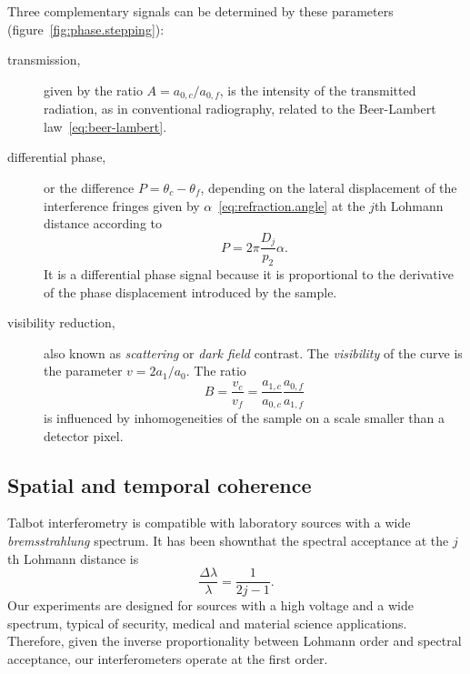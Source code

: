 Three complementary signals can be determined by these parameters
(figure~\ref{fig:phase.stepping}):
\begin{description}
    \item[transmission,] given by the ratio $A = a_{0,c} / a_{0,f}$, is the
        intensity of the transmitted radiation, as in conventional
        radiography, related to the Beer-Lambert
        law~\eqref{eq:beer-lambert}.
    \item[differential phase,] or the difference $P = \theta_{c} -
        \theta_f$, depending on the lateral displacement of the interference
        fringes given by
        $\alpha$~\eqref{eq:refraction.angle} at the
        $j$th Lohmann distance according to
        \begin{equation}
            P = 2\pi \frac{D_j}{p_2}\alpha.\label{eq:differential.phase}
        \end{equation}
        It is a differential phase signal because it is proportional to the
        derivative of the phase displacement introduced by the sample.
    \item[visibility reduction,] also known as 
        \emph{scattering} or \emph{dark field} contrast. The
        \emph{visibility} of the curve is the parameter
        $v = 2a_1 / a_0$. The ratio
        \begin{equation*}
            B = \frac{v_c}{v_f} =
            \frac{a_{1,c}}{a_{0,c}}\frac{a_{0,f}}{a_{1,f}}
        \end{equation*}
        is influenced by inhomogeneities of the sample on a scale smaller
        than a detector pixel\cn.
\end{description}

\subsection{Spatial and temporal coherence}
Talbot interferometry is compatible with laboratory sources with a wide
\emph{bremsstrahlung} spectrum. It has been shown\cn that the spectral
acceptance at the $j$th Lohmann distance is
\begin{equation}
    \frac{\Delta \lambda}{\lambda} = \frac{1}{2j - 1}.\label{eq:acceptance}
\end{equation}
Our experiments are designed for sources with a high voltage and a wide
spectrum, typical of security, medical and material science applications.
Therefore, given the inverse proportionality between Lohmann order
and spectral acceptance, our interferometers operate at the first order.

